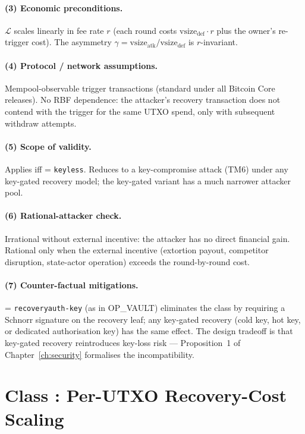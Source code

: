\paragraph{(3) Economic preconditions.}
$\mathcal{L}$ scales linearly in fee rate $r$ (each round costs
$\text{vsize}_{\text{def}} \cdot r$ plus the owner's re-trigger
cost). The asymmetry $\gamma = \text{vsize}_{\text{atk}} /
\text{vsize}_{\text{def}}$ is $r$-invariant.

\paragraph{(4) Protocol / network assumptions.}
Mempool-observable trigger transactions (standard under
all Bitcoin Core releases). No RBF dependence: the attacker's
recovery transaction does not contend with the trigger for the same
UTXO spend, only with subsequent withdraw attempts.

\paragraph{(5) Scope of validity.}
Applies iff \axauth{} = \texttt{keyless}. Reduces to a
key-compromise attack (TM6) under any key-gated recovery model;
the key-gated variant has a much narrower attacker pool.

\paragraph{(6) Rational-attacker check.}
Irrational without external incentive: the attacker has no direct
financial gain. Rational only when the external incentive (extortion
payout, competitor disruption, state-actor operation) exceeds the
round-by-round cost.

\paragraph{(7) Counter-factual mitigations.}
\axauth{} = \texttt{recoveryauth-key} (as in OP\_VAULT) eliminates
the class by requiring a Schnorr signature on the recovery leaf;
any key-gated recovery (cold key, hot key, or dedicated authorisation
key) has the same effect. The design tradeoff is that key-gated
recovery reintroduces key-loss risk --- Proposition~1 of
Chapter~\ref{ch:security} formalises the incompatibility.

\section{Class \classscale{}: Per-UTXO Recovery-Cost Scaling}
\label{app:rat:classscale}

